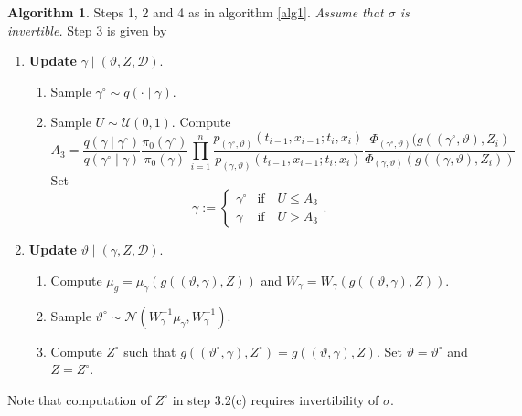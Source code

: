 \documentclass[preprint]{imsart}
\newcommand{\si}{\sigma}
\newcommand{\ga}{\gamma}
\newcommand{\scr}[1]{{\mathcal #1}}
\theoremstyle{definition}
\newtheorem{algorithm}{Algorithm}
\begin{document}
\begin{algorithm}\label{alg2}
Steps 1, 2 and 4 as in algorithm \ref{alg1}. {\it Assume that $\sigma$ is invertible.}  Step 3 is given by 
\begin{enumerate}
\item[3.1] {\bf Update }$\gamma  \mid (\vartheta, Z, \scr{D})$. 



\begin{enumerate}
\item Sample ${\gamma^\circ} \sim q(\cdot \mid \gamma)$.
\item  Sample $U \sim \scr{U}(0,1)$. Compute
\[	 A_3=\frac{q(\gamma \mid {\gamma^\circ})}{q({\gamma^\circ} \mid \ga)}  \frac{\pi_0({\gamma^\circ})}{\pi_0(\ga)}\prod_{i=1}^n\frac{p_{({\gamma^\circ},\vartheta)}(t_{i-1},x_{i-1}; t_i, x_i)}{p_{(\ga,\vartheta)}(t_{i-1},x_{i-1}; t_i, x_i)}
\frac{\Phi_{ ({\gamma^\circ},\vartheta)}(g(({\gamma^\circ},\vartheta), Z_i)}{\Phi_{ (\ga,\vartheta)}(g((\ga,\vartheta),Z_i))}  \]
Set 
\[\ga := \begin{cases} {\gamma^\circ} & \text{if}\quad U\le A_3 \\
 \ga & \text{if}\quad U> A_3 \end{cases}. \]
\end{enumerate}

\item[3.2] {\bf Update }$\vartheta \mid  (\gamma, Z,  \scr{D})$.  
\begin{enumerate}
\item Compute $\mu_g = \mu_\ga(g((\vartheta, \gamma), Z))$ and $W_\gamma = W_\ga(g((\vartheta, \gamma), Z))$.
\item Sample ${\vartheta^\circ} \sim \scr N(W_\ga^{-1}\mu_\ga, W_\ga^{-1})$.
\item Compute $Z^\circ$ such that $g(({\vartheta^\circ}, \gamma), Z^\circ) = g((\vartheta, \gamma), Z)$. Set  $\vartheta = \vartheta^\circ$ and $Z = Z^\circ$.
\end{enumerate}

\end{enumerate}
\end{algorithm}
Note that computation of $Z^\circ$ in step 3.2(c) requires invertibility of $\si$. 
\end{document}
